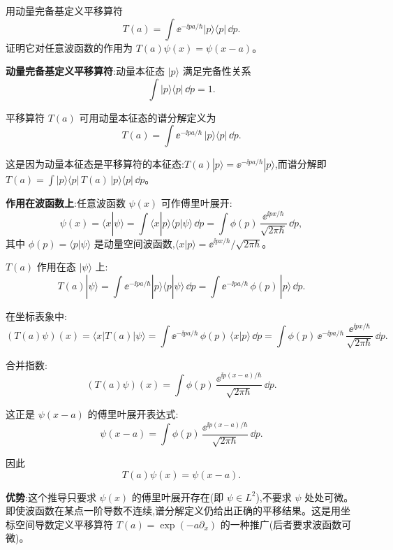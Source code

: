 \begin{question}
用动量完备基定义平移算符
\[
T(a)=\int \ee^{-\ii pa/\hbar}|p\rangle\langle p|\,\dd p.
\]
证明它对任意波函数的作用为 $T(a)\psi(x)=\psi(x-a)$。
\begin{solution}
	\textbf{动量完备基定义平移算符}:动量本征态 $|p\rangle$ 满足完备性关系
	\[
	\int |p\rangle\langle p|\,\dd p = 1.
	\]

	平移算符 $T(a)$ 可用动量本征态的谱分解定义为
	\[
	T(a) = \int \ee^{-\ii pa/\hbar}\,|p\rangle\langle p|\,\dd p.
	\]

	这是因为动量本征态是平移算符的本征态:$T(a)|p\rangle = \ee^{-\ii pa/\hbar}|p\rangle$,而谱分解即 $T(a)=\int |p\rangle\langle p|\,T(a)\,|p\rangle\langle p|\,\dd p$。

	\textbf{作用在波函数上}:任意波函数 $\psi(x)$ 可作傅里叶展开:
	\[
	\psi(x) = \langle x|\psi\rangle = \int \langle x|p\rangle\langle p|\psi\rangle\,\dd p
	= \int \phi(p)\,\frac{\ee^{\ii px/\hbar}}{\sqrt{2\pi\hbar}}\,\dd p,
	\]
	其中 $\phi(p)=\langle p|\psi\rangle$ 是动量空间波函数,$\langle x|p\rangle = \ee^{\ii px/\hbar}/\sqrt{2\pi\hbar}$。

	$T(a)$ 作用在态 $|\psi\rangle$ 上:
	\[
	T(a)|\psi\rangle = \int \ee^{-\ii pa/\hbar}|p\rangle\langle p|\psi\rangle\,\dd p
	= \int \ee^{-\ii pa/\hbar}\,\phi(p)\,|p\rangle\,\dd p.
	\]

	在坐标表象中:
	\[
	(T(a)\psi)(x) = \langle x|T(a)|\psi\rangle
	= \int \ee^{-\ii pa/\hbar}\,\phi(p)\,\langle x|p\rangle\,\dd p
	= \int \phi(p)\,\ee^{-\ii pa/\hbar}\,\frac{\ee^{\ii px/\hbar}}{\sqrt{2\pi\hbar}}\,\dd p.
	\]

	合并指数:
	\[
	(T(a)\psi)(x) = \int \phi(p)\,\frac{\ee^{\ii p(x-a)/\hbar}}{\sqrt{2\pi\hbar}}\,\dd p.
	\]

	这正是 $\psi(x-a)$ 的傅里叶展开表达式:
	\[
	\psi(x-a) = \int \phi(p)\,\frac{\ee^{\ii p(x-a)/\hbar}}{\sqrt{2\pi\hbar}}\,\dd p.
	\]

	因此
	\[
	\boxed{T(a)\psi(x) = \psi(x-a)}.
	\]

	\textbf{优势}:这个推导只要求 $\psi(x)$ 的傅里叶展开存在(即 $\psi\in L^2$),不要求 $\psi$ 处处可微。即使波函数在某点一阶导数不连续,谱分解定义仍给出正确的平移结果。这是用坐标空间导数定义平移算符 $T(a)=\exp(-a\partial_x)$ 的一种推广(后者要求波函数可微)。
	\end{solution}
\end{question}

